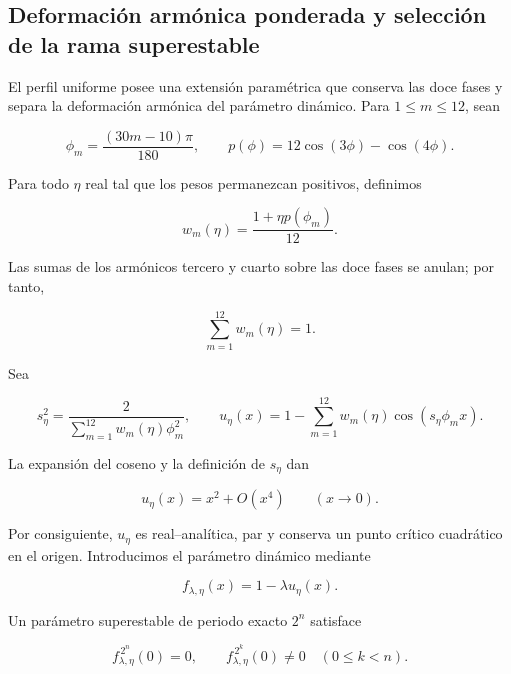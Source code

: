 \subsection{Deformación armónica ponderada y selección de la rama superestable}
\label{mab:sec:extension-dodecafasica-ponderada-armonica}

El perfil uniforme posee una extensión paramétrica que conserva las doce
fases y separa la deformación armónica del parámetro dinámico. Para
\(1\le m\le12\), sean

\begin{equation}
 \phi_m=\frac{(30m-10)\pi}{180},
 \qquad
 p(\phi)=12\cos(3\phi)-\cos(4\phi).
 \label{mab:eq:fases-y-deformacion-armonica-armonizada}
\end{equation}

Para todo \(\eta\) real tal que los pesos permanezcan positivos, definimos

\begin{equation}
 w_m(\eta)=\frac{1+\eta p(\phi_m)}{12}.
 \label{mab:eq:pesos-dodecafasicos-armonizados}
\end{equation}

Las sumas de los armónicos tercero y cuarto sobre las doce fases se anulan;
por tanto,

\[
 \sum_{m=1}^{12}w_m(\eta)=1.
\]

Sea

\begin{equation}
 s_\eta^2=\frac{2}{\sum_{m=1}^{12}w_m(\eta)\phi_m^2},
 \qquad
 u_\eta(x)=1-\sum_{m=1}^{12}w_m(\eta)
 \cos(s_\eta\phi_m x).
 \label{mab:eq:familia-ponderada-armonizada}
\end{equation}

La expansión del coseno y la definición de \(s_\eta\) dan

\[
 u_\eta(x)=x^2+O(x^4)\qquad(x\to0).
\]

Por consiguiente, \(u_\eta\) es real--analítica, par y conserva un punto
crítico cuadrático en el origen. Introducimos el parámetro dinámico mediante

\begin{equation}
 f_{\lambda,\eta}(x)=1-\lambda u_\eta(x).
 \label{mab:eq:familia-feigenbaum-ponderada-armonizada}
\end{equation}

Un parámetro superestable de periodo exacto \(2^n\) satisface

\[
 f_{\lambda,\eta}^{\,2^n}(0)=0,
 \qquad
 f_{\lambda,\eta}^{\,2^k}(0)\ne0\quad(0\le k<n).
\]

